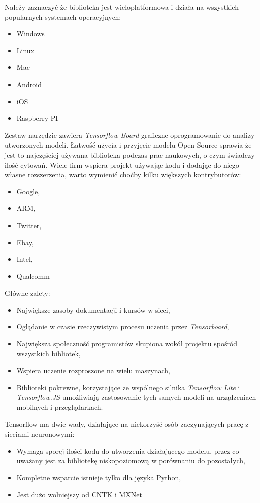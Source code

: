 \documentclass[12pt,a4paper,twoside,titlepage,openright]{book}
\begin{document}
Należy zaznaczyć że biblioteka jest wieloplatformowa i działa na wszystkich popularnych systemach operacyjnych:
\begin{itemize}
\item Windows
\item Linux
\item Mac
\item Android
\item iOS
\item Raspberry PI
\end{itemize}

Zestaw narzędzie zawiera \textit{Tensorflow Board} graficzne oprogramowanie do analizy utworzonych modeli. Łatwość użycia i przyjęcie modelu Open Source sprawia że jest to najczęściej używana biblioteka podczas prac naukowych, o czym świadczy ilość cytowań. \cite{siteTensorflowCitations} Wiele firm wspiera projekt używając kodu i dodając do niego własne rozszerzenia, warto wymienić choćby kilku większych kontrybutorów:
\begin{itemize}
\item Google,
\item ARM,
\item Twitter,
\item Ebay,
\item Intel,
\item Qualcomm
\end{itemize}

Główne zalety:
\begin{itemize}
\item Największe zasoby dokumentacji i kursów w sieci,
\item Oglądanie w czasie rzeczywistym procesu uczenia przez \textit{Tensorboard},
\item Największa społeczność programistów skupiona wokół projektu spośród wszystkich bibliotek,
\item Wspiera uczenie rozproszone na wielu maszynach,
\item Biblioteki pokrewne, korzystające ze wspólnego silnika \textit{Tensorflow Lite} i \textit{Tensorflow.JS} umożliwiają zastosowanie tych samych modeli na urządzeniach mobilnych i przeglądarkach.
\end{itemize}

Tensorflow ma dwie wady, działające na niekorzyść osób zaczynających pracę z sieciami neuronowymi:
\begin{itemize}
\item Wymaga sporej ilości kodu do utworzenia działającego modelu, przez co uważany jest za bibliotekę niskopoziomową w porównaniu do pozostałych,
\item Kompletne wsparcie istnieje tylko dla języka Python, 
\item Jest dużo wolniejszy od CNTK i MXNet \cite{DBLP:journals/corr/ShiWXC16}
\end{itemize}
\end{document}
